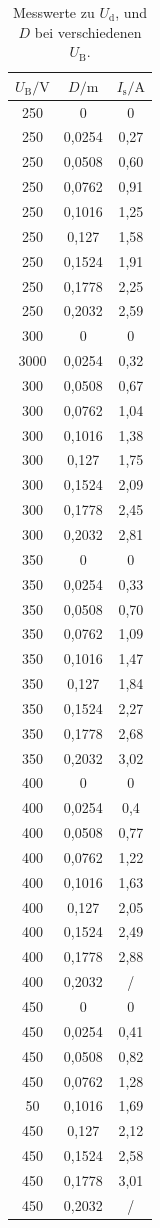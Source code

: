 \begin{table}
  \caption{Messwerte zu $U_\mathrm{d}$, und $D$ bei verschiedenen $U_\mathrm{B}$.}
  \centering
  \label{tab:messwerte2}
  \begin{tabular}{c c c}
    \toprule
    $U_\mathrm{B}/ \si{\volt}$ & $D/\si{\meter}$ & $I_\mathrm{s}/\si{\ampere}$\\
    \midrule
250 & 0 & 0 \\
250 & 0,0254 & 0,27 \\
250 & 0,0508 & 0,60 \\
250 & 0,0762 & 0,91 \\
250 & 0,1016 & 1,25 \\
250 & 0,127 & 1,58 \\
250 & 0,1524 & 1,91 \\
250 & 0,1778 & 2,25 \\
250 & 0,2032 & 2,59 \\
300 & 0  & 0 \\
3000 & 0,0254 &0,32 \\
300 & 0,0508 & 0,67 \\
300 & 0,0762 & 1,04 \\
300 & 0,1016 & 1,38 \\
300 & 0,127 & 1,75 \\
300 & 0,1524 & 2,09 \\
300 & 0,1778 & 2,45 \\
300 & 0,2032 & 2,81 \\
350 & 0  & 0 \\
350 & 0,0254 & 0,33 \\
350 & 0,0508 & 0,70\\
350 & 0,0762 & 1,09 \\
350 & 0,1016 & 1,47 \\
350 & 0,127 & 1,84 \\
350 & 0,1524 & 2,27 \\
350 & 0,1778 &2,68 \\
350 & 0,2032 & 3,02 \\
400 & 0  & 0 \\
400 & 0,0254 & 0,4 \\
400 & 0,0508 & 0,77 \\
400 & 0,0762 & 1,22 \\
400 & 0,1016 & 1,63 \\
400 & 0,127 & 2,05 \\
400 & 0,1524 & 2,49 \\
400 & 0,1778 & 2,88 \\
400 & 0,2032 & / \\
450 & 0  & 0 \\
450 & 0,0254 & 0,41 \\
450 & 0,0508 & 0,82 \\
450 & 0,0762 & 1,28 \\
50 & 0,1016 & 1,69 \\
450 & 0,127 & 2,12 \\
450 & 0,1524 & 2,58 \\
450 & 0,1778 & 3,01 \\
450 & 0,2032 & / \\
\bottomrule
\end{tabular}
\end{table}

